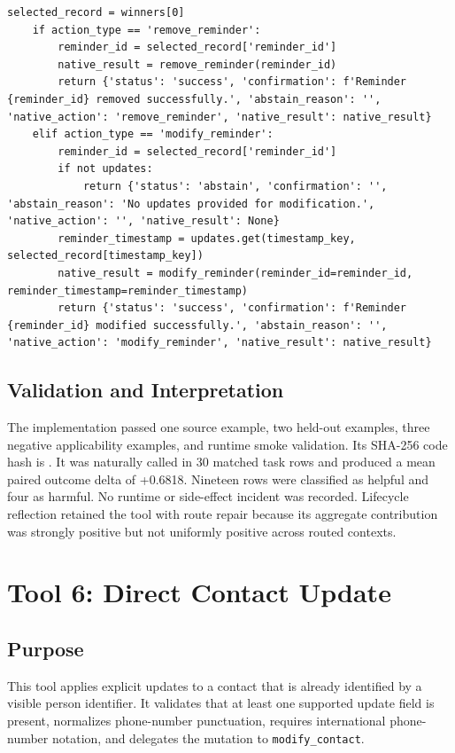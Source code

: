 \begin{lstlisting}[style=sagepython,caption={Accepted reminder-recency native-action tool.},label={lst:sage-recency-action-target}]
    selected_record = winners[0]
    if action_type == 'remove_reminder':
        reminder_id = selected_record['reminder_id']
        native_result = remove_reminder(reminder_id)
        return {'status': 'success', 'confirmation': f'Reminder {reminder_id} removed successfully.', 'abstain_reason': '', 'native_action': 'remove_reminder', 'native_result': native_result}
    elif action_type == 'modify_reminder':
        reminder_id = selected_record['reminder_id']
        if not updates:
            return {'status': 'abstain', 'confirmation': '', 'abstain_reason': 'No updates provided for modification.', 'native_action': '', 'native_result': None}
        reminder_timestamp = updates.get(timestamp_key, selected_record[timestamp_key])
        native_result = modify_reminder(reminder_id=reminder_id, reminder_timestamp=reminder_timestamp)
        return {'status': 'success', 'confirmation': f'Reminder {reminder_id} modified successfully.', 'abstain_reason': '', 'native_action': 'modify_reminder', 'native_result': native_result}
\end{lstlisting}

\subsection{Validation and
Interpretation}\label{validation-and-interpretation-4}

The implementation passed one source example, two held-out examples,
three negative applicability examples, and runtime smoke validation. Its
SHA-256 code hash is
.
It was naturally called in 30 matched task rows and produced a mean
paired outcome delta of +0.6818. Nineteen rows were classified as
helpful and four as harmful. No runtime or side-effect incident was
recorded. Lifecycle reflection retained the tool with route repair
because its aggregate contribution was strongly positive but not
uniformly positive across routed contexts.

\section{Tool 6: Direct Contact Update}
\label{sec:appendix-contact-update-id}

\subsection{Purpose}\label{purpose-5}

This tool applies explicit updates to a contact that is already
identified by a visible person identifier. It validates that at least
one supported update field is present, normalizes phone-number
punctuation, requires international phone-number notation, and delegates
the mutation to \texttt{modify\_contact}.

